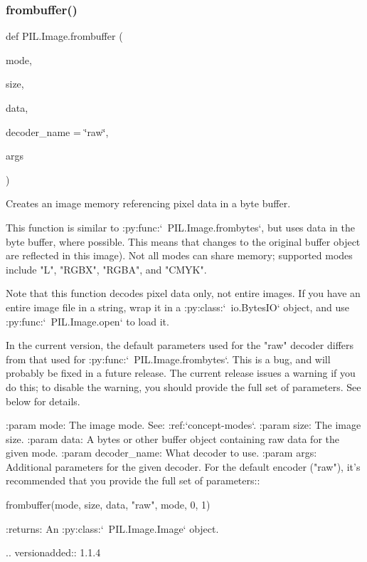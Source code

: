 \subsubsection{\texorpdfstring{frombuffer()}{frombuffer()}}
{\footnotesize\ttfamily def P\+I\+L.\+Image.\+frombuffer (\begin{DoxyParamCaption}\item[{}]{mode,  }\item[{}]{size,  }\item[{}]{data,  }\item[{}]{decoder\+\_\+name = {\ttfamily \char`\"{}raw\char`\"{}},  }\item[{}]{args }\end{DoxyParamCaption})}

\begin{DoxyVerb}Creates an image memory referencing pixel data in a byte buffer.

This function is similar to :py:func:`~PIL.Image.frombytes`, but uses data
in the byte buffer, where possible.  This means that changes to the
original buffer object are reflected in this image).  Not all modes can
share memory; supported modes include "L", "RGBX", "RGBA", and "CMYK".

Note that this function decodes pixel data only, not entire images.
If you have an entire image file in a string, wrap it in a
:py:class:`~io.BytesIO` object, and use :py:func:`~PIL.Image.open` to load it.

In the current version, the default parameters used for the "raw" decoder
differs from that used for :py:func:`~PIL.Image.frombytes`.  This is a
bug, and will probably be fixed in a future release.  The current release
issues a warning if you do this; to disable the warning, you should provide
the full set of parameters.  See below for details.

:param mode: The image mode. See: :ref:`concept-modes`.
:param size: The image size.
:param data: A bytes or other buffer object containing raw
    data for the given mode.
:param decoder_name: What decoder to use.
:param args: Additional parameters for the given decoder.  For the
    default encoder ("raw"), it's recommended that you provide the
    full set of parameters::

        frombuffer(mode, size, data, "raw", mode, 0, 1)

:returns: An :py:class:`~PIL.Image.Image` object.

.. versionadded:: 1.1.4
\end{DoxyVerb}
 \mbox{\label{namespacePIL_1_1Image_a32a745719bae0c9b016e2959c851cc22}} 
